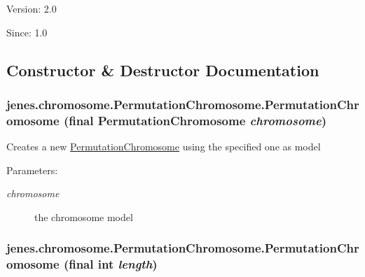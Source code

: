 \begin{Desc}
\item[Version:]2.0 \end{Desc}
\begin{Desc}
\item[Since:]1.0 \end{Desc}


\subsection{Constructor \& Destructor Documentation}
\hypertarget{classjenes_1_1chromosome_1_1_permutation_chromosome_10cdd7769af8702d9b367b1a7a17214d}{
\subsubsection[PermutationChromosome]{\setlength{\rightskip}{0pt plus 5cm}jenes.chromosome.PermutationChromosome.PermutationChromosome (final {\bf PermutationChromosome} {\em chromosome})}}
\label{classjenes_1_1chromosome_1_1_permutation_chromosome_10cdd7769af8702d9b367b1a7a17214d}


Creates a new \hyperlink{classjenes_1_1chromosome_1_1_permutation_chromosome}{PermutationChromosome} using the specified one as model

\begin{Desc}
\item[Parameters:]
\begin{description}
\item[{\em chromosome}]the chromosome model \end{description}
\end{Desc}
\hypertarget{classjenes_1_1chromosome_1_1_permutation_chromosome_7c3b4e904d419c51af512f1f82faa109}{
\subsubsection[PermutationChromosome]{\setlength{\rightskip}{0pt plus 5cm}jenes.chromosome.PermutationChromosome.PermutationChromosome (final int {\em length})}}
\label{classjenes_1_1chromosome_1_1_permutation_chromosome_7c3b4e904d419c51af512f1f82faa109}


